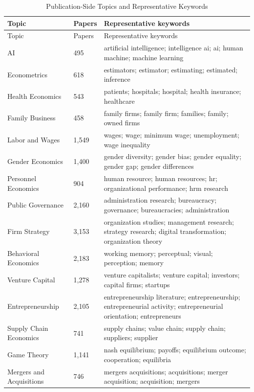 \documentclass[11pt]{article}
\begin{document}
\begingroup
\scriptsize
\setlength{\LTcapwidth}{\textwidth}
\begin{longtable}{p{}p{}p{}}
\caption{Publication-Side Topics and Representative Keywords}\label{tab:paper_topic_keywords}\\
\toprule
Topic & Papers & Representative keywords \\
\midrule
\endfirsthead
\toprule
Topic & Papers & Representative keywords \\
\midrule
\endhead
AI & 495 & artificial intelligence; intelligence ai; ai; human machine; machine learning \\
Econometrics & 618 & estimators; estimator; estimating; estimated; inference \\
Health Economics & 543 & patients; hospitals; hospital; health insurance; healthcare \\
Family Business & 458 & family firms; family firm; families; family; owned firms \\
Labor and Wages & 1,549 & wages; wage; minimum wage; unemployment; wage inequality \\
Gender Economics & 1,400 & gender diversity; gender bias; gender equality; gender gap; gender differences \\
Personnel Economics & 904 & human resource; human resources; hr; organizational performance; hrm research \\
Public Governance & 2,160 & administration research; bureaucracy; governance; bureaucracies; administration \\
Firm Strategy & 3,153 & organization studies; management research; strategy research; digital transformation; organization theory \\
Behavioral Economics & 2,183 & working memory; perceptual; visual; perception; memory \\
Venture Capital & 1,278 & venture capitalists; venture capital; investors; capital firms; startups \\
Entrepreneurship & 2,105 & entrepreneurship literature; entrepreneurship; entrepreneurial activity; entrepreneurial orientation; entrepreneurs \\
Supply Chain Economics & 741 & supply chains; value chain; supply chain; suppliers; supplier \\
Game Theory & 1,141 & nash equilibrium; payoffs; equilibrium outcome; cooperation; equilibria \\
Mergers and Acquisitions & 746 & mergers acquisitions; acquisitions; merger acquisition; acquisition; mergers \\

\end{longtable}
\end{document}
